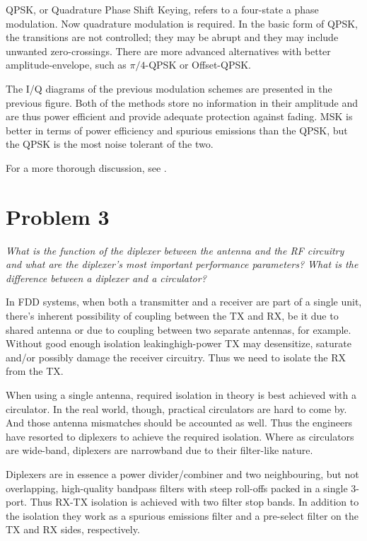 \documentclass[a4paper, 12pt]{article}
\begin{document}
QPSK, or Quadrature Phase Shift Keying, refers to a four-state a phase modulation. Now quadrature 
modulation is required. In the basic form of QPSK, the transitions are not controlled; they may 
be abrupt and they may include unwanted zero-crossings. There are more advanced alternatives with 
better amplitude-envelope, such as $\pi/4$-QPSK or Offset-QPSK.

The I/Q diagrams of the previous modulation schemes are presented in the previous figure. Both 
of the methods store no information in their amplitude and are thus power efficient and provide 
adequate protection against fading. MSK is better in terms of power efficiency and spurious 
emissions than the QPSK, but the QPSK is the most noise tolerant of the two. \cite{parts}

For a more thorough discussion, see \cite{parts}.


\section*{Problem 3}

\textit{What is the function of the diplexer between the antenna and the RF 
circuitry and what are the diplexer’s most important performance parameters? 
What is the difference between a diplexer and a circulator?}

In FDD systems, when both a transmitter and a receiver are part of a single unit, 
there's inherent possibility of coupling between the TX and RX, be it due to shared 
antenna or due to coupling between two separate antennas, for example. Without 
good enough isolation leakinghigh-power TX may desensitize, saturate and/or 
possibly damage the receiver circuitry. Thus we need to isolate the RX from 
the TX.

When using a single antenna, required isolation in theory is best achieved 
with a circulator. In the real world, though, practical circulators are hard 
to come by. And those antenna mismatches should be accounted as well. Thus 
the engineers have resorted to diplexers to achieve the required isolation. 
Where as circulators are wide-band, diplexers are narrowband due to their 
filter-like nature. 

Diplexers are in essence a power divider/combiner and two neighbouring, but 
not overlapping, high-quality bandpass filters with steep roll-offs packed 
in a single 3-port. Thus RX-TX isolation is achieved with two filter stop bands. 
In addition to the isolation they work as a spurious emissions filter and a 
pre-select filter on the TX and RX sides, respectively.
\end{document}
